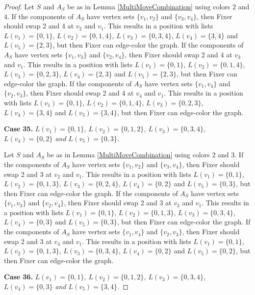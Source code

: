 \documentclass[12pt]{amsart}
\theoremstyle{plain}
\theoremstyle{definition}
\theoremstyle{remark}
\begin{document}
\begin{proof}
Let $S$ and $A_S$ be as in Lemma \ref{MultiMoveCombination} using colors $2$ and $4$. If the components of $A_S$ have vertex sets $\{v_1, v_2\}$ and $\{v_3, v_4\}$, then Fixer should swap 2 and 4 at $v_2$ and $v_1$. This results in a position with lists $L(v_1) = \{0, 1\}$, $L(v_2) = \{0, 1, 4\}$, $L(v_3) = \{0, 3, 4\}$, $L(v_4) = \{3, 4\}$ and $L(v_5) = \{2, 3\}$, but then Fixer can edge-color the graph.
If the components of $A_S$ have vertex sets $\{v_1, v_3\}$ and $\{v_2, v_4\}$, then Fixer should swap 2 and 4 at $v_3$ and $v_1$. This results in a position with lists $L(v_1) = \{0, 1\}$, $L(v_2) = \{0, 1, 4\}$, $L(v_3) = \{0, 2, 3\}$, $L(v_4) = \{2, 3\}$ and $L(v_5) = \{2, 3\}$, but then Fixer can edge-color the graph.
If the components of $A_S$ have vertex sets $\{v_1, v_4\}$ and $\{v_2, v_3\}$, then Fixer should swap 2 and 4 at $v_4$ and $v_1$. This results in a position with lists $L(v_1) = \{0, 1\}$, $L(v_2) = \{0, 1, 4\}$, $L(v_3) = \{0, 2, 3\}$, $L(v_4) = \{3, 4\}$ and $L(v_5) = \{3, 4\}$, but then Fixer can edge-color the graph.

\noindent\textbf{Case 35.  }\textit{$L(v_1) = \{0, 1\}$, $L(v_2) = \{0, 1, 2\}$, $L(v_3) = \{0, 3, 4\}$, $L(v_4) = \{0, 2\}$ and $L(v_5) = \{0, 3\}$.}

Let $S$ and $A_S$ be as in Lemma \ref{MultiMoveCombination} using colors $2$ and $3$. If the components of $A_S$ have vertex sets $\{v_1, v_2\}$ and $\{v_3, v_4\}$, then Fixer should swap 2 and 3 at $v_2$ and $v_1$. This results in a position with lists $L(v_1) = \{0, 1\}$, $L(v_2) = \{0, 1, 3\}$, $L(v_3) = \{0, 2, 4\}$, $L(v_4) = \{0, 2\}$ and $L(v_5) = \{0, 3\}$, but then Fixer can edge-color the graph.
If the components of $A_S$ have vertex sets $\{v_1, v_3\}$ and $\{v_2, v_4\}$, then Fixer should swap 2 and 3 at $v_3$ and $v_1$. This results in a position with lists $L(v_1) = \{0, 1\}$, $L(v_2) = \{0, 1, 3\}$, $L(v_3) = \{0, 3, 4\}$, $L(v_4) = \{0, 3\}$ and $L(v_5) = \{0, 3\}$, but then Fixer can edge-color the graph.
If the components of $A_S$ have vertex sets $\{v_1, v_4\}$ and $\{v_2, v_3\}$, then Fixer should swap 2 and 3 at $v_4$ and $v_1$. This results in a position with lists $L(v_1) = \{0, 1\}$, $L(v_2) = \{0, 1, 3\}$, $L(v_3) = \{0, 3, 4\}$, $L(v_4) = \{0, 2\}$ and $L(v_5) = \{0, 2\}$, but then Fixer can edge-color the graph.

\noindent\textbf{Case 36.  }\textit{$L(v_1) = \{0, 1\}$, $L(v_2) = \{0, 1, 2\}$, $L(v_3) = \{0, 3, 4\}$, $L(v_4) = \{0, 3\}$ and $L(v_5) = \{3, 4\}$.}


\end{proof}
\end{document}

